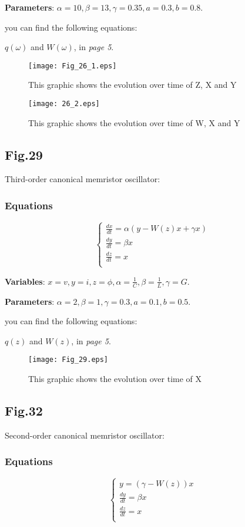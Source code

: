 \documentclass[12pt, a4paper]{paper}
\begin{document}
\textbf{Parameters}: $\alpha =10, \beta =13, \gamma =0.35, a=0.3, b=0.8$.

you can find the following equations:

$q(\omega)$ and $W(\omega)$, in \textit{page 5}.
\begin{figure}[h]
\centering
\texttt{[image: Fig\_26\_1.eps]}
\caption{This graphic shows the evolution over time of Z, X and Y}
\end{figure}

\begin{figure}[h]
\centering
\texttt{[image: 26\_2.eps]}
\caption{This graphic shows the evolution over time of W, X and Y}
\end{figure}


\newpage
\subsection{Fig.29}
Third-order canonical memristor oscillator:
\subsubsection{Equations}
\begin{equation}
\begin{cases}
\frac{dx}{dt}=\alpha(y-W(z)x+\gamma x)
\\
\frac{dy}{dt}=\beta x
\\
\frac{dz}{dt}=x
\\
\end{cases}
\end{equation}

\textbf{Variables}: $x=v, y=i, z=\phi, \alpha=\frac{1}{C},
\beta=\frac{1}{L}, \gamma=G$.

\textbf{Parameters}: $\alpha =2, \beta =1, \gamma =0.3, a=0.1, b=0.5$.

you can find the following equations:

$q(z)$ and $W(z)$, in \textit{page 5}.

\begin{figure}[h]
\centering
\texttt{[image: Fig\_29.eps]}
\caption{This graphic shows the evolution over time of X}
\end{figure}

\newpage
\subsection{Fig.32}
Second-order canonical memristor oscillator:
\subsubsection{Equations}
\begin{equation}
\begin{cases}
y=(\gamma-W(z))x
\\
\frac{dy}{dt}=\beta x
\\
\frac{dz}{dt}=x
\\
\end{cases}
\end{equation}
\end{document}
